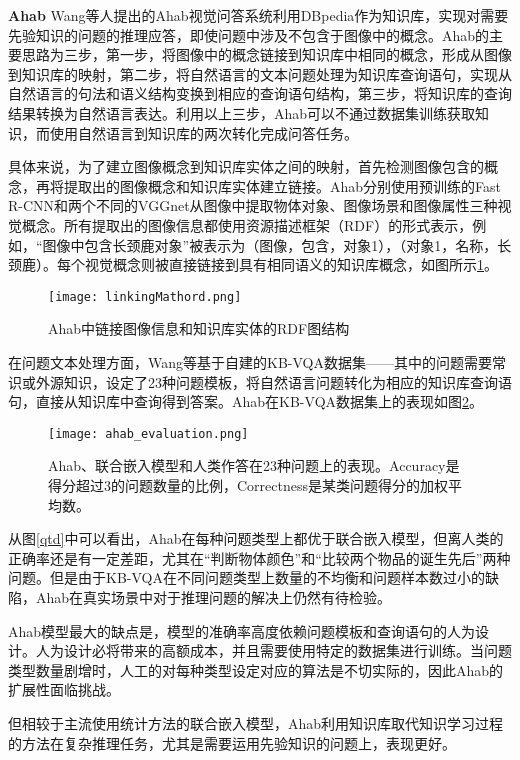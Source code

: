 \textbf{Ahab}
Wang等人提出的Ahab视觉问答系统利用DBpedia作为知识库，实现对需要先验知识的问题的推理应答，即使问题中涉及不包含于图像中的概念。Ahab的主要思路为三步，第一步，将图像中的概念链接到知识库中相同的概念，形成从图像到知识库的映射，第二步，将自然语言的文本问题处理为知识库查询语句，实现从自然语言的句法和语义结构变换到相应的查询语句结构，第三步，将知识库的查询结果转换为自然语言表达。利用以上三步，Ahab可以不通过数据集训练获取知识，而使用自然语言到知识库的两次转化完成问答任务。

具体来说，为了建立图像概念到知识库实体之间的映射，首先检测图像包含的概念，再将提取出的图像概念和知识库实体建立链接。Ahab分别使用预训练的Fast R-CNN和两个不同的VGGnet从图像中提取物体对象、图像场景和图像属性三种视觉概念。所有提取出的图像信息都使用资源描述框架（RDF）的形式表示，例如，“图像中包含长颈鹿对象”被表示为（图像，包含，对象1），（对象1，名称，长颈鹿）。每个视觉概念则被直接链接到具有相同语义的知识库概念，如图所示\ref{linkingMathord}。
\begin{figure}[H]
	\centering
	\texttt{[image: linkingMathord.png]}
	\caption{Ahab中链接图像信息和知识库实体的RDF图结构}
	\label{linkingMathord}
\end{figure}

在问题文本处理方面，Wang等基于自建的KB-VQA数据集——其中的问题需要常识或外源知识，设定了23种问题模板，将自然语言问题转化为相应的知识库查询语句，直接从知识库中查询得到答案。Ahab在KB-VQA数据集上的表现如图\ref{ahab_evaluation}。
\begin{figure}[H]
	\centering
	\texttt{[image: ahab\_evaluation.png]}
	\caption{Ahab、联合嵌入模型和人类作答在23种问题上的表现。Accuracy是得分超过3的问题数量的比例，Correctness是某类问题得分的加权平均数。}
	\label{ahab_evaluation}
\end{figure}

从图\ref{qtd}中可以看出，Ahab在每种问题类型上都优于联合嵌入模型，但离人类的正确率还是有一定差距，尤其在“判断物体颜色”和“比较两个物品的诞生先后”两种问题。但是由于KB-VQA在不同问题类型上数量的不均衡和问题样本数过小的缺陷，Ahab在真实场景中对于推理问题的解决上仍然有待检验。

Ahab模型最大的缺点是，模型的准确率高度依赖问题模板和查询语句的人为设计。人为设计必将带来的高额成本，并且需要使用特定的数据集进行训练。当问题类型数量剧增时，人工的对每种类型设定对应的算法是不切实际的，因此Ahab的扩展性面临挑战。

但相较于主流使用统计方法的联合嵌入模型，Ahab利用知识库取代知识学习过程的方法在复杂推理任务，尤其是需要运用先验知识的问题上，表现更好。

